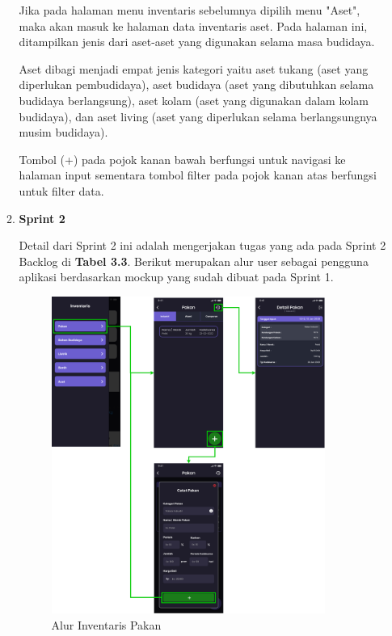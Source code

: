 \begin{enumerate}
\begin{enumerate}
		Jika pada halaman menu inventaris sebelumnya dipilih menu "Aset", maka akan masuk ke halaman data inventaris aset. Pada halaman ini, ditampilkan jenis dari aset-aset yang digunakan selama masa budidaya.
		
		Aset dibagi menjadi empat jenis kategori yaitu aset tukang (aset yang diperlukan pembudidaya), aset budidaya (aset yang dibutuhkan selama budidaya berlangsung), aset kolam (aset yang digunakan dalam kolam budidaya), dan aset living (aset yang diperlukan selama berlangsungnya musim budidaya).

		Tombol (+) pada pojok kanan bawah berfungsi untuk navigasi ke halaman input sementara tombol filter pada pojok kanan atas berfungsi untuk filter data.

		\item \textbf{Sprint 2}
		
		Detail dari Sprint 2 ini adalah mengerjakan tugas yang ada pada Sprint 2 Backlog di \textbf{Tabel 3.3}. Berikut merupakan alur user sebagai pengguna aplikasi berdasarkan mockup yang sudah dibuat pada Sprint 1.

		\begin{figure}[H]
			\centering
			\includegraphics[width=0.9\textwidth]{gambar/sprint2/flow_feed.png}
			\caption{Alur Inventaris Pakan}
		\end{figure}


\end{enumerate}
\end{enumerate}
